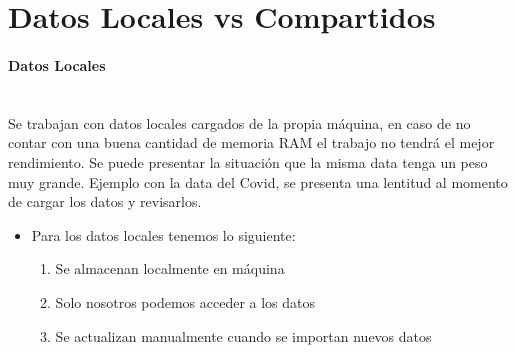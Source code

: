 \documentclass[a4paper]{report} %
\begin{document}
        \section{Datos Locales vs Compartidos}
          \paragraph{Datos Locales}\mbox{} \\
            Se trabajan con datos locales cargados de la propia máquina, en caso de no contar con una buena cantidad de memoria RAM el trabajo no tendrá el mejor rendimiento. Se puede presentar la situación que la misma data tenga un peso muy grande. Ejemplo con la data del Covid, se presenta una lentitud al momento de cargar los datos y revisarlos.
              \begin{itemize}
                 \item Para los datos locales tenemos lo siguiente:
                    \begin{enumerate}
                      \item Se almacenan localmente en máquina
                      \item Solo nosotros podemos acceder a los datos
                      \item Se actualizan manualmente cuando se importan nuevos datos
                    \end{enumerate}
              \end{itemize}
\end{document}
